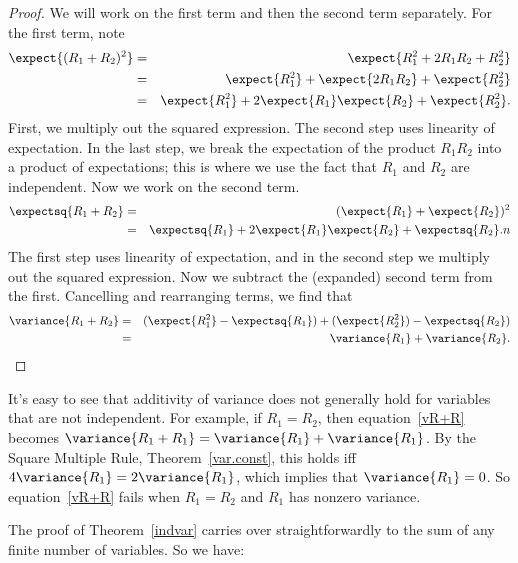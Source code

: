 \begin{proof}
We will work on the first term and then the second term separately.
For the first term, note\begin{eqnarray*}
\expect{(R_1+R_2)^2}
& = &   \expect{R_1^2 + 2 R_1 R_2 + R_2^2} \\
& = &   \expect{R_1^2} + \expect{2 R_1 R_2} + \expect{R_2^2} \\
& = &   \expect{R_1^2} + 2 \expect{R_1} \expect{R_2} + \expect{R_2^2}.
\end{eqnarray*}
First, we multiply out the squared expression.  The second step uses
linearity of expectation.  In the last step, we break the
expectation of the product $R_1 R_2$ into a product of expectations;
this is where we use the fact that $R_1$ and $R_2$ are independent.
Now we work on the second term.
\begin{eqnarray*}
\expectsq{R_1+R_2} & = & (\expect{R_1} + \expect{R_2})^2 \\
& = & \expectsq{R_1} + 2 \expect{R_1} \expect{R_2} + \expectsq{R_2}.
n\end{eqnarray*}
The first step uses linearity of expectation, and in the second step
we multiply out the squared expression.  Now we subtract the
(expanded) second term from the first. Cancelling and rearranging
terms, we find that
\begin{eqnarray*}
\variance{R_1 + R_2} & = &   (\expect{R_1^2} - \expectsq{R_1}) +
(\expect{R_2^2}) - \expectsq{R_2}) \\
& = &   \variance{R_1} + \variance{R_2}.
\end{eqnarray*}
\fi
\end{proof}

It's easy to see that additivity of variance does not generally hold
for variables that are not independent.  For example, if $R_1=R_2$,
then equation~\eqref{vR+R} becomes $\variance{R_1 + R_1} =
\variance{R_1} + \variance{R_1}$.  By the Square Multiple Rule,
Theorem~\ref{var.const}, this holds iff $4 \variance{R_1} = 2
\variance{R_1}$, which implies that $\variance{R_1}=0$.  So
equation~\eqref{vR+R} fails when $R_1=R_2$ and $R_1$ has nonzero
variance.

The proof of Theorem~\ref{indvar} carries over straightforwardly to
the sum of any finite number of variables.  So we have:

